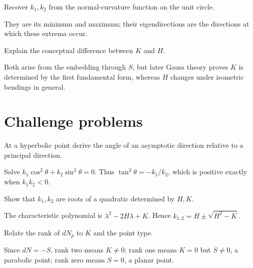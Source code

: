 \begin{problem}\label{prob:vii17-11}
Recover \(k_1,k_2\) from the normal-curvature function on the unit circle.
\end{problem}
\begin{solution}
They are its minimum and maximum; their eigendirections are the directions at which these extrema occur.
\end{solution}

\begin{problem}\label{prob:vii17-12}
Explain the conceptual difference between \(K\) and \(H\).
\end{problem}
\begin{solution}
Both arise from the embedding through \(S\), but later Gauss theory proves \(K\) is determined by the first fundamental form, whereas \(H\) changes under isometric bendings in general.
\end{solution}

\section{Challenge problems}
\begin{problem}\label{prob:vii17-ch01}
At a hyperbolic point derive the angle of an asymptotic direction relative to a principal direction.
\end{problem}
\begin{solution}
Solve \(k_1\cos^2\theta+k_2\sin^2\theta=0\). Thus \(\tan^2\theta=-k_1/k_2\), which is positive exactly when \(k_1k_2<0\).
\end{solution}

\begin{problem}\label{prob:vii17-ch02}
Show that \(k_1,k_2\) are roots of a quadratic determined by \(H,K\).
\end{problem}
\begin{solution}
The characteristic polynomial is \(\lambda^2-2H\lambda+K\). Hence \(k_{1,2}=H\pm\sqrt{H^2-K}\).
\end{solution}

\begin{problem}\label{prob:vii17-ch03}
Relate the rank of \(dN_p\) to \(K\) and the point type.
\end{problem}
\begin{solution}
Since \(dN=-S\), rank two means \(K\ne0\); rank one means \(K=0\) but \(S\ne0\), a parabolic point; rank zero means \(S=0\), a planar point.
\end{solution}


